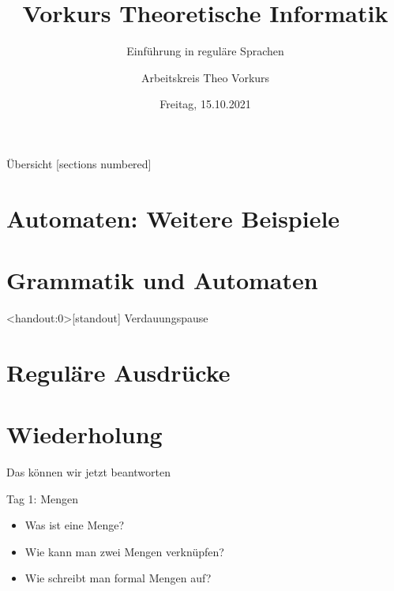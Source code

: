 

\title{Vorkurs Theoretische Informatik}
\subtitle{Einführung in reguläre Sprachen}
\date{Freitag, 15.10.2021}
\author{Arbeitskreis Theo Vorkurs}



\maketitle

\begin{frame}[fragile]{Übersicht}
    [sections numbered]
    \tableofcontents%
\end{frame}

\section{Automaten: Weitere Beispiele}



\section{Grammatik und Automaten}



\begin{frame}<handout:0>[standout]
    Verdauungspause
\end{frame}

\section{Reguläre Ausdrücke}




\section{Wiederholung}
\begin{frame}[fragile]{Das können wir jetzt beantworten}
    \begin{alertblock}{Tag 1: Mengen}
        \begin{itemize}
            \item Was ist eine Menge?
            \item Wie kann man zwei Mengen verknüpfen?
            \item Wie schreibt man formal Mengen auf?
        \end{itemize}
    \end{alertblock}
\end{frame}

